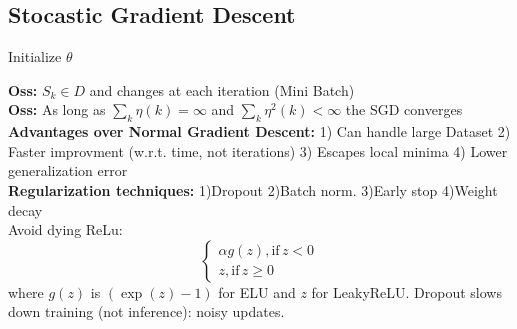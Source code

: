 \subsection*{Stocastic Gradient Descent}
\begin{algorithm}[H]
     Initialize $\theta$\;
    \end{algorithm}
\textbf{Oss:} $S_k \in D$ and changes at each iteration (Mini Batch)  \\
\textbf{Oss:} As long as $\sum_k \eta(k) = \infty$ and $\sum_k \eta^2(k) <  \infty$ the SGD converges\\  
\textbf{Advantages over Normal Gradient Descent:} 1) Can handle large Dataset 2) Faster improvment (w.r.t. time, not iterations) 3) Escapes local minima 4) Lower generalization error\\
\textbf{Regularization techniques:} 1)Dropout 2)Batch norm. 3)Early stop 4)Weight decay\\

Avoid dying ReLu: 
\begin{equation*}
     \begin{cases}
    \alpha g(z), \text{if}\hspace{2pt} z < 0\\
    z, \text{if}\hspace{2pt} z \geq 0
    
    \end{cases}
\end{equation*}
where $g(z)$ is $(\exp{(z)} - 1)$ for ELU and $z$ for LeakyReLU.
Dropout slows down training (not inference): noisy updates.